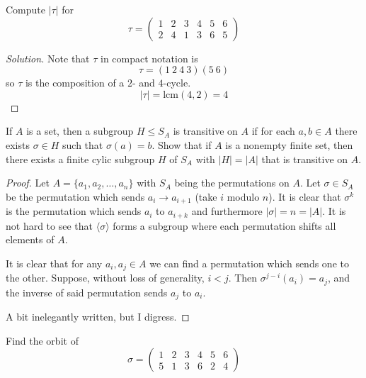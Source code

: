 \newpage 
\begin{prob}
    Compute $|\tau|$ for 
    \[
        \tau = 
        \begin{pmatrix}
            1 & 2 & 3 & 4 & 5 & 6 \\ 
            2 & 4 & 1 & 3 & 6 & 5 
        \end{pmatrix}
    \]
\end{prob}
\begin{proof}[Solution]
    Note that $\tau$ in compact notation is 
    \[
        \tau = (1 \ 2 \ 4 \ 3)(5 \ 6)
    \]
    so $\tau$ is the composition of a $2$- and $4$-cycle. 
    \[
        |\tau| = \text{lcm}(4, 2) = 4
    \]
\end{proof}
\begin{prob}
    If $A$ is a set, then a subgroup $H \leq S_A$ is transitive 
    on $A$ if for each $a,b \in A$ there exists $\sigma \in H$ 
    such that $\sigma(a)=b$. Show that if $A$ is a nonempty finite 
    set, then there exists a finite cylic subgroup $H$ of $S_A$ 
    with $|H| = |A|$ that is transitive on $A$.
\end{prob}
\begin{proof}
    Let $A = \{a_1, a_2, \ldots, a_n\}$ with $S_A$ being the 
    permutations on $A$. Let $\sigma \in S_A$ be the permutation which 
    sends $a_i \to a_{i+1}$ (take $i$ modulo $n$). It is clear that 
    $\sigma^k$ is the permutation which sends $a_i$ to $a_{i+k}$ and 
    furthermore $|\sigma| = n = |A|$. It is not hard to see 
    that $\langle\sigma\rangle$ forms a subgroup 
    where each permutation shifts 
    all elements of $A$. 
    
    It is clear that for any $a_i, a_j \in A$ we can find 
    a permutation which sends one to the other. Suppose, without 
    loss of generality, $i < j$. Then 
    $\sigma^{j-i}(a_i) = a_j$, and the inverse of said permutation 
    sends $a_j$ to $a_i$.

    A bit inelegantly written, but I digress. 
\end{proof}
\begin{prob}
    Find the orbit of 
    \[
        \sigma = 
        \begin{pmatrix}
            1 & 2 & 3 & 4 & 5 & 6 \\ 
            5 & 1 & 3 & 6 & 2 & 4
        \end{pmatrix}
    \]
\end{prob}
